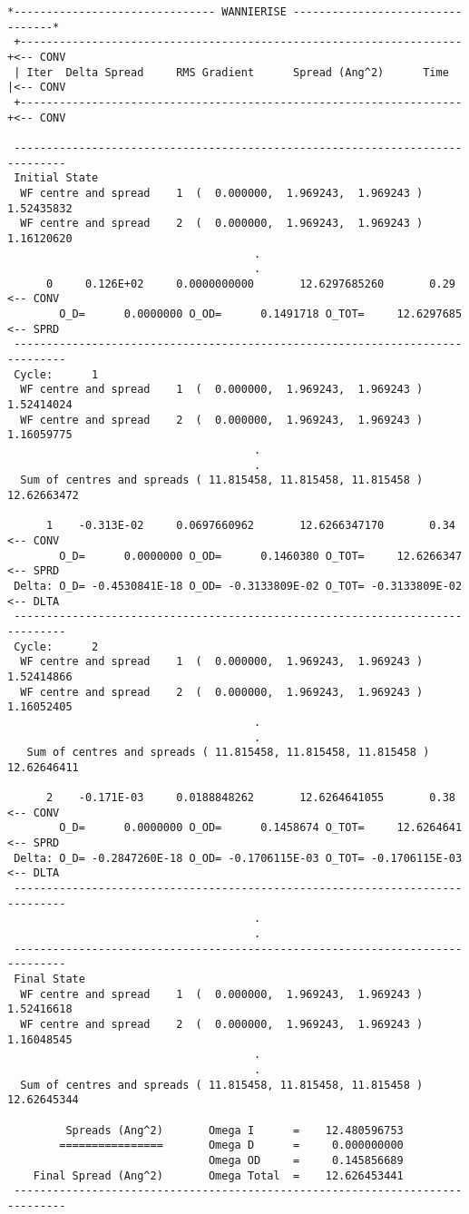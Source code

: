 \begin{verbatim}
*------------------------------- WANNIERISE ---------------------------------*
 +--------------------------------------------------------------------+<-- CONV
 | Iter  Delta Spread     RMS Gradient      Spread (Ang^2)      Time  |<-- CONV
 +--------------------------------------------------------------------+<-- CONV
 
 ------------------------------------------------------------------------------
 Initial State
  WF centre and spread    1  (  0.000000,  1.969243,  1.969243 )     1.52435832
  WF centre and spread    2  (  0.000000,  1.969243,  1.969243 )     1.16120620
                                      .
                                      .
      0     0.126E+02     0.0000000000       12.6297685260       0.29  <-- CONV
        O_D=      0.0000000 O_OD=      0.1491718 O_TOT=     12.6297685 <-- SPRD
 ------------------------------------------------------------------------------
 Cycle:      1
  WF centre and spread    1  (  0.000000,  1.969243,  1.969243 )     1.52414024
  WF centre and spread    2  (  0.000000,  1.969243,  1.969243 )     1.16059775
                                      .
                                      .
  Sum of centres and spreads ( 11.815458, 11.815458, 11.815458 )    12.62663472
 
      1    -0.313E-02     0.0697660962       12.6266347170       0.34  <-- CONV
        O_D=      0.0000000 O_OD=      0.1460380 O_TOT=     12.6266347 <-- SPRD
 Delta: O_D= -0.4530841E-18 O_OD= -0.3133809E-02 O_TOT= -0.3133809E-02 <-- DLTA
 ------------------------------------------------------------------------------
 Cycle:      2
  WF centre and spread    1  (  0.000000,  1.969243,  1.969243 )     1.52414866
  WF centre and spread    2  (  0.000000,  1.969243,  1.969243 )     1.16052405
                                      .
                                      .
   Sum of centres and spreads ( 11.815458, 11.815458, 11.815458 )    12.62646411
 
      2    -0.171E-03     0.0188848262       12.6264641055       0.38  <-- CONV
        O_D=      0.0000000 O_OD=      0.1458674 O_TOT=     12.6264641 <-- SPRD
 Delta: O_D= -0.2847260E-18 O_OD= -0.1706115E-03 O_TOT= -0.1706115E-03 <-- DLTA
 ------------------------------------------------------------------------------
                                      .
                                      .
 ------------------------------------------------------------------------------
 Final State
  WF centre and spread    1  (  0.000000,  1.969243,  1.969243 )     1.52416618
  WF centre and spread    2  (  0.000000,  1.969243,  1.969243 )     1.16048545
                                      .
                                      .
  Sum of centres and spreads ( 11.815458, 11.815458, 11.815458 )    12.62645344
 
         Spreads (Ang^2)       Omega I      =    12.480596753
        ================       Omega D      =     0.000000000
                               Omega OD     =     0.145856689
    Final Spread (Ang^2)       Omega Total  =    12.626453441
 ------------------------------------------------------------------------------
\end{verbatim}

